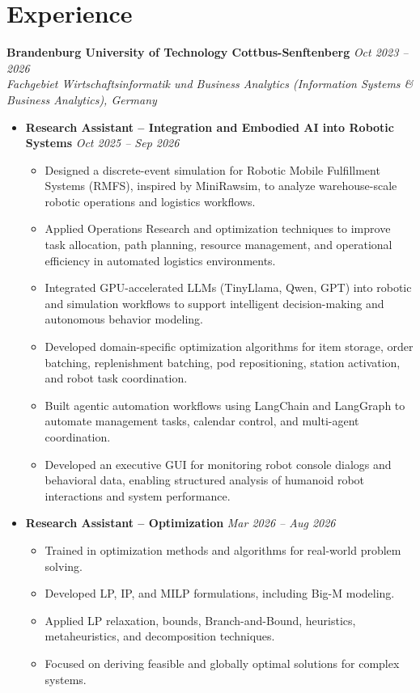 \documentclass[10pt, a4paper]{article}
\begin{document}
\section*{Experience}

\textbf{Brandenburg University of Technology Cottbus-Senftenberg} \hfill \textit{Oct 2023 -- 2026} \\
\textit{Fachgebiet Wirtschaftsinformatik und Business Analytics (Information Systems \& Business Analytics), Germany}

\begin{itemize}
  \item \textbf{Research Assistant – Integration and Embodied AI into Robotic Systems} \hfill \textit{Oct 2025 -- Sep 2026}
\begin{itemize}[leftmargin=1.2em, itemsep=1.5pt]
    \item Designed a discrete-event simulation for Robotic Mobile Fulfillment Systems (RMFS), inspired by MiniRawsim, to analyze warehouse-scale robotic operations and logistics workflows.
    
    \item Applied Operations Research and optimization techniques to improve task allocation, path planning, resource management, and operational efficiency in automated logistics environments.
    
    \item Integrated GPU-accelerated LLMs (TinyLlama, Qwen, GPT) into robotic and simulation workflows to support intelligent decision-making and autonomous behavior modeling.
    
    \item Developed domain-specific optimization algorithms for item storage, order batching, replenishment batching, pod repositioning, station activation, and robot task coordination.
    
    \item Built agentic automation workflows using LangChain and LangGraph to automate management tasks, calendar control, and multi-agent coordination.
    
    \item Developed an executive GUI for monitoring robot console dialogs and behavioral data, enabling structured analysis of humanoid robot interactions and system performance.
\end{itemize}

  \item \textbf{Research Assistant – Optimization} \hfill \textit{Mar 2026 -- Aug 2026}
  \begin{itemize}[leftmargin=1.2em, itemsep=1.5pt]
    \item Trained in optimization methods and algorithms for real-world problem solving.
    \item Developed LP, IP, and MILP formulations, including Big-M modeling.
    \item Applied LP relaxation, bounds, Branch-and-Bound, heuristics, metaheuristics, and decomposition techniques.
    \item Focused on deriving feasible and globally optimal solutions for complex systems.
  \end{itemize}


\end{itemize}
\end{document}
